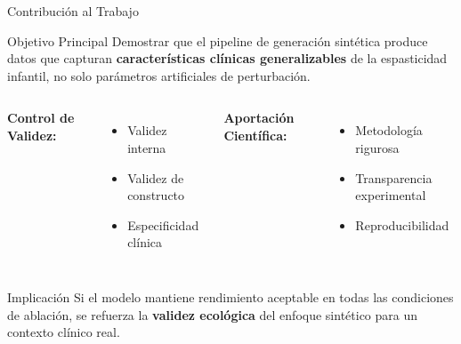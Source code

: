 \documentclass[aspectratio=169]{beamer}
\begin{document}
\begin{frame}{Contribución al Trabajo}
\begin{block}{Objetivo Principal}
Demostrar que el pipeline de generación sintética produce datos que capturan \textbf{características clínicas generalizables} de la espasticidad infantil, no solo parámetros artificiales de perturbación.
\end{block}

\vspace{0.5cm}

\begin{columns}
\textbf{Control de Validez:}
\begin{itemize}
\item Validez interna
\item Validez de constructo
\item Especificidad clínica
\end{itemize}

\textbf{Aportación Científica:}
\begin{itemize}
\item Metodología rigurosa
\item Transparencia experimental
\item Reproducibilidad
\end{itemize}
\end{columns}

\vspace{0.5cm}

\begin{alertblock}{Implicación}
Si el modelo mantiene rendimiento aceptable en todas las condiciones de ablación, se refuerza la \textbf{validez ecológica} del enfoque sintético para un contexto clínico real.
\end{alertblock}
\end{frame}
\end{document}
